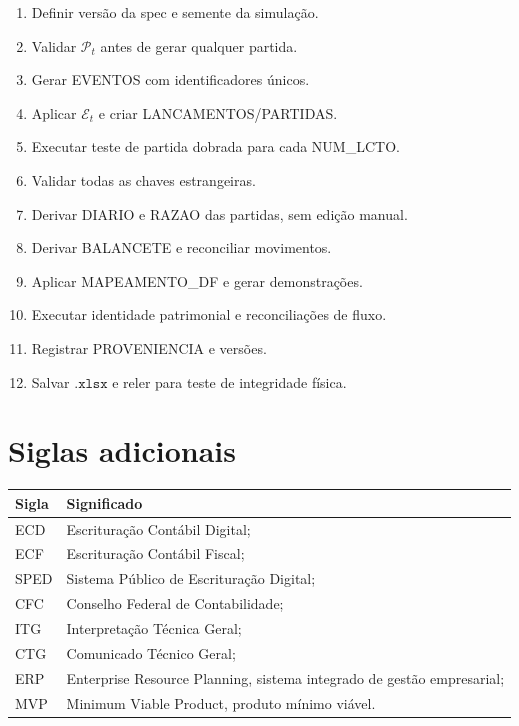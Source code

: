 \documentclass[11pt,a4paper]{article}
\newcommand{\Plano}{\mathcal{P}}
\newcommand{\cE}{\mathcal{E}}
\begin{document}
\begin{enumerate}
    \item Definir versão da spec e semente da simulação.
    \item Validar $\Plano_t$ antes de gerar qualquer partida.
    \item Gerar EVENTOS com identificadores únicos.
    \item Aplicar $\cE_t$ e criar LANCAMENTOS/PARTIDAS.
    \item Executar teste de partida dobrada para cada NUM\_LCTO.
    \item Validar todas as chaves estrangeiras.
    \item Derivar DIARIO e RAZAO das partidas, sem edição manual.
    \item Derivar BALANCETE e reconciliar movimentos.
    \item Aplicar MAPEAMENTO\_DF e gerar demonstrações.
    \item Executar identidade patrimonial e reconciliações de fluxo.
    \item Registrar PROVENIENCIA e versões.
    \item Salvar $\texttt{.xlsx}$ e reler para teste de integridade física.
\end{enumerate}

\section{Siglas adicionais}

\begin{longtable}{p{} p{}}
\toprule
\textbf{Sigla} & \textbf{Significado}\\
\midrule
ECD & Escrituração Contábil Digital;\\
ECF & Escrituração Contábil Fiscal;\\
SPED & Sistema Público de Escrituração Digital;\\
CFC & Conselho Federal de Contabilidade;\\
ITG & Interpretação Técnica Geral;\\
CTG & Comunicado Técnico Geral;\\
ERP & Enterprise Resource Planning, sistema integrado de gestão empresarial;\\
MVP & Minimum Viable Product, produto mínimo viável.\\
\bottomrule
\end{longtable}
\end{document}
